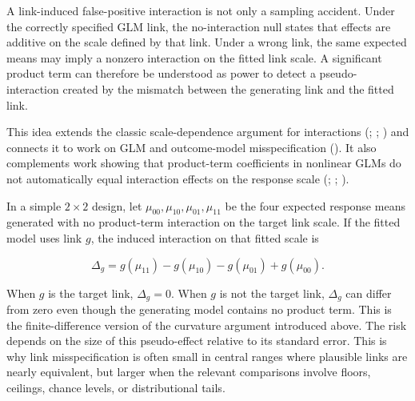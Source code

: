 \documentclass[
  man,
  longtable,
  nolmodern,
  notxfonts,
  notimes,
  colorlinks=true,linkcolor=blue,citecolor=blue,urlcolor=blue]{apa7}
\begin{document}
\begin{tcolorbox}[enhanced jigsaw, toprule=.15mm, colbacktitle=quarto-callout-note-color!10!white, title={Pseudo-interactions as power against the wrong null}, bottomtitle=1mm, rightrule=.15mm, colback=white, toptitle=1mm, breakable, opacitybacktitle=0.6, bottomrule=.15mm, coltitle=black, titlerule=0mm, arc=.35mm, opacityback=0, colframe=quarto-callout-note-color-frame, leftrule=.75mm, left=2mm]

A link-induced false-positive interaction is not only a sampling
accident. Under the correctly specified GLM link, the no-interaction
null states that effects are additive on the scale defined by that link.
Under a wrong link, the same expected means may imply a nonzero
interaction on the fitted link scale. A significant product term can
therefore be understood as power to detect a pseudo-interaction created
by the mismatch between the generating link and the fitted link.

This idea extends the classic scale-dependence argument for interactions
(; ; ) and
connects it to work on GLM and outcome-model misspecification
(). It also
complements work showing that product-term coefficients in nonlinear
GLMs do not automatically equal interaction effects on the response
scale (;
;
).

In a simple \(2 \times 2\) design, let
\(\mu_{00}, \mu_{10}, \mu_{01}, \mu_{11}\) be the four expected response
means generated with no product-term interaction on the target link
scale. If the fitted model uses link \(g\), the induced interaction on
that fitted scale is

\[
\Delta_g =
g(\mu_{11}) - g(\mu_{10}) - g(\mu_{01}) + g(\mu_{00}).
\]

When \(g\) is the target link, \(\Delta_g = 0\). When \(g\) is not the
target link, \(\Delta_g\) can differ from zero even though the
generating model contains no product term. This is the finite-difference
version of the curvature argument introduced above. The risk depends on
the size of this pseudo-effect relative to its standard error. This is
why link misspecification is often small in central ranges where
plausible links are nearly equivalent, but larger when the relevant
comparisons involve floors, ceilings, chance levels, or distributional
tails.

\end{tcolorbox}
\end{document}
